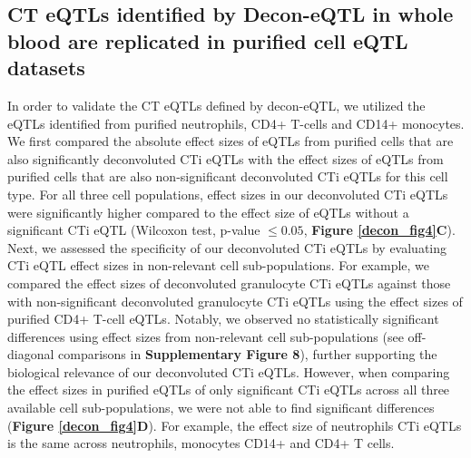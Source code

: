 \subsection{CT eQTLs identified by Decon-eQTL in whole blood are replicated in purified cell eQTL datasets}
In order to validate the CT eQTLs defined by decon-eQTL, we utilized the eQTLs identified from purified neutrophils, CD4+ T-cells and CD14+ monocytes\cite{chenGeneticDriversEpigenetic2016}. We first compared the absolute effect sizes of eQTLs from purified cells that are also significantly deconvoluted CTi eQTLs with the effect sizes of eQTLs from purified cells that are also non-significant deconvoluted CTi eQTLs for this cell type. For all three cell populations, effect sizes in our deconvoluted CTi eQTLs were significantly higher compared to the effect size of eQTLs without a significant CTi eQTL (Wilcoxon test, p-value $\leq 0.05$, \textbf{Figure \ref{decon_fig4}C}). Next, we assessed the specificity of our deconvoluted CTi eQTLs by evaluating CTi eQTL effect sizes in non-relevant cell sub-populations. For example, we compared the effect sizes of deconvoluted granulocyte CTi eQTLs against those with non-significant deconvoluted granulocyte CTi eQTLs using the effect sizes of purified CD4+ T-cell eQTLs. Notably, we observed no statistically significant differences using effect sizes from non-relevant cell sub-populations (see off-diagonal comparisons in \textbf{Supplementary Figure 8}), further supporting the biological relevance of our deconvoluted CTi eQTLs. However, when comparing the effect sizes in purified eQTLs of only significant CTi eQTLs across all three available cell sub-populations, we were not able to find significant differences (\textbf{Figure \ref{decon_fig4}D}). For example, the effect size of neutrophils CTi eQTLs is the same across neutrophils, monocytes CD14+ and CD4+ T cells.

